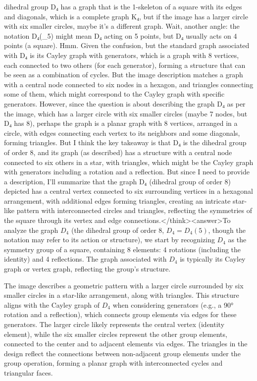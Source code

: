 dihedral group D₄ has a graph that is the 1-skeleton of a square with its edges and diagonals, which is a complete graph K₄, but if the image has a larger circle with six smaller circles, maybe it's a different graph. Wait, another angle: the notation D₄(_5) might mean D₄ acting on 5 points, but D₄ usually acts on 4 points (a square). Hmm. Given the confusion, but the standard graph associated with D₄ is its Cayley graph with generators, which is a graph with 8 vertices, each connected to two others (for each generator), forming a structure that can be seen as a combination of cycles. But the image description matches a graph with a central node connected to six nodes in a hexagon, and triangles connecting some of them, which might correspond to the Cayley graph with specific generators. However, since the question is about describing the graph D₄ as per the image, which has a larger circle with six smaller circles (maybe 7 nodes, but D₄ has 8), perhaps the graph is a planar graph with 8 vertices, arranged in a circle, with edges connecting each vertex to its neighbors and some diagonals, forming triangles. But I think the key takeaway is that D₄ is the dihedral group of order 8, and its graph (as described) has a structure with a central node connected to six others in a star, with triangles, which might be the Cayley graph with generators including a rotation and a reflection. But since I need to provide a description, I'll summarize that the graph D₄ (dihedral group of order 8) depicted has a central vertex connected to six surrounding vertices in a hexagonal arrangement, with additional edges forming triangles, creating an intricate star-like pattern with interconnected circles and triangles, reflecting the symmetries of the square through its vertex and edge connections.</think><answer>To analyze the graph \( D_4 \) (the dihedral group of order 8, \( D_4 = D_4(5) \), though the notation may refer to its action or structure), we start by recognizing \( D_4 \) as the symmetry group of a square, containing 8 elements: 4 rotations (including the identity) and 4 reflections. The graph associated with \( D_4 \) is typically its Cayley graph or vertex graph, reflecting the group's structure.  

The image describes a geometric pattern with a larger circle surrounded by six smaller circles in a star-like arrangement, along with triangles. This structure aligns with the Cayley graph of \( D_4 \) when considering generators (e.g., a 90° rotation and a reflection), which connects group elements via edges for these generators. The larger circle likely represents the central vertex (identity element), while the six smaller circles represent the other group elements, connected to the center and to adjacent elements via edges. The triangles in the design reflect the connections between non-adjacent group elements under the group operation, forming a planar graph with interconnected cycles and triangular faces.  

